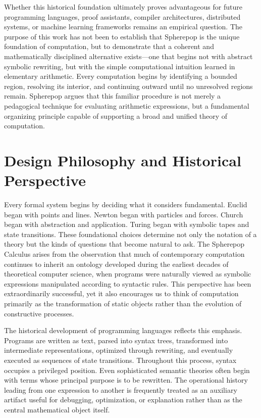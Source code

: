 \documentclass[12pt,oneside]{article}
\theoremstyle{definition}
\theoremstyle{remark}
\begin{document}
Whether this historical foundation ultimately proves advantageous for future
programming languages, proof assistants, compiler architectures, distributed
systems, or machine learning frameworks remains an empirical question. The
purpose of this work has not been to establish that Spherepop is the unique
foundation of computation, but to demonstrate that a coherent and mathematically
disciplined alternative exists—one that begins not with abstract symbolic
rewriting, but with the simple computational intuition learned in elementary
arithmetic. Every computation begins by identifying a bounded region, resolving
its interior, and continuing outward until no unresolved regions remain.
Spherepop argues that this familiar procedure is not merely a pedagogical
technique for evaluating arithmetic expressions, but a fundamental organizing
principle capable of supporting a broad and unified theory of computation.

\section{Design Philosophy and Historical Perspective}

Every formal system begins by deciding what it considers fundamental. Euclid
began with points and lines. Newton began with particles and forces. Church
began with abstraction and application. Turing began with symbolic tapes and
state transitions. These foundational choices determine not only the notation
of a theory but the kinds of questions that become natural to ask. The
Spherepop Calculus arises from the observation that much of contemporary
computation continues to inherit an ontology developed during the earliest
decades of theoretical computer science, when programs were naturally viewed
as symbolic expressions manipulated according to syntactic rules. This
perspective has been extraordinarily successful, yet it also encourages us to
think of computation primarily as the transformation of static objects rather
than the evolution of constructive processes.

The historical development of programming languages reflects this emphasis.
Programs are written as text, parsed into syntax trees, transformed into
intermediate representations, optimized through rewriting, and eventually
executed as sequences of state transitions. Throughout this process, syntax
occupies a privileged position. Even sophisticated semantic theories often
begin with terms whose principal purpose is to be rewritten. The operational
history leading from one expression to another is frequently treated as an
auxiliary artifact useful for debugging, optimization, or explanation rather
than as the central mathematical object itself.
\end{document}
